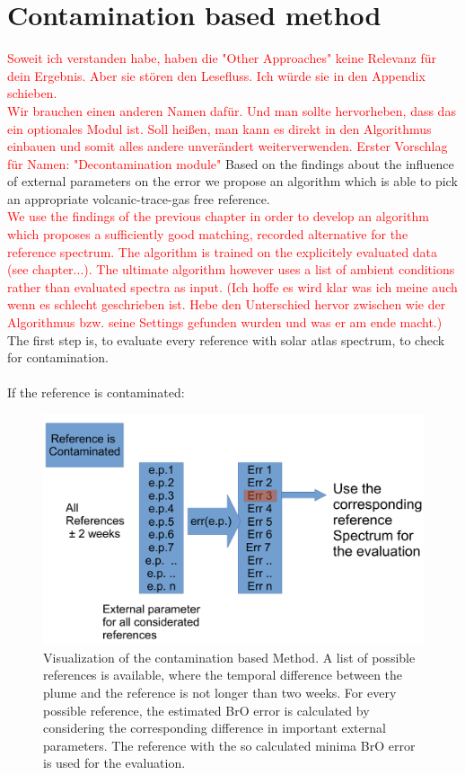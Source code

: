 \documentclass  [
  paper    = a4,
  BCOR     = 10mm,
  twoside,
  fontsize = 12pt,
  fleqn,
  toc      = bibnumbered,
  toc      = listofnumbered,
  numbers  = noendperiod,
  headings = normal,
  listof   = leveldown,
  version  = 3.03
]                                       {scrreprt}
\begin{document}
\chapter{Contamination based method \label{chapt:contbased}}
\textcolor{red}{Soweit ich verstanden habe, haben die "Other Approaches" keine Relevanz für dein Ergebnis. Aber sie stören den Lesefluss. Ich würde sie in den Appendix schieben.}\\
\textcolor{red}{Wir brauchen einen anderen Namen dafür. Und man sollte hervorheben, dass das ein optionales Modul ist. Soll heißen, man kann es direkt in den Algorithmus einbauen und somit alles andere unverändert weiterverwenden. Erster Vorschlag für Namen: "Decontamination module"}
	Based on the findings about the influence of external parameters on the  error we propose an algorithm which is able to pick an appropriate volcanic-trace-gas free reference.\\ \textcolor{red}{We use the findings of the previous chapter in order to develop an algorithm which proposes a sufficiently good matching, recorded alternative for the reference spectrum. The algorithm is trained on the explicitely evaluated data (see chapter...). The ultimate algorithm however uses a list of ambient conditions rather than evaluated spectra as input. (Ich hoffe es wird klar was ich meine auch wenn es schlecht geschrieben ist. Hebe den Unterschied hervor zwischen wie der Algorithmus bzw. seine Settings gefunden wurden und was er am ende macht.)}
	The first step is, to evaluate every reference with solar atlas spectrum, to check for contamination.\\
	\\
	If the reference is contaminated:
	\begin{figure}
		\centering
		\includegraphics[width=0.7\linewidth]{Bilder/Cont}
		\caption{Visualization of the contamination based Method. A list of possible references is available, where the temporal difference between the plume and the reference is not longer than two weeks. For every possible reference, the estimated BrO error is calculated by considering the corresponding difference in important external parameters. The reference with the so calculated minima BrO error is used for the evaluation.}
		\label{fig:Cont}
	\end{figure}
\end{document}
